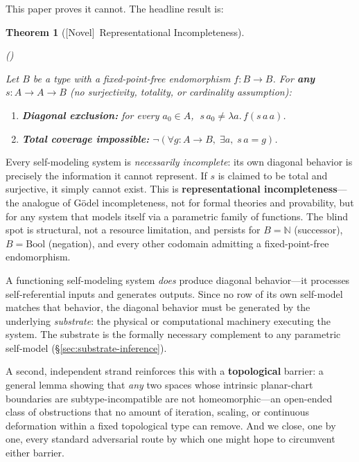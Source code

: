 \documentclass[11pt]{article}
\newtheorem{theorem}{Theorem}[section]
\newcommand{\novel}{\textcolor{blue!70!black}{[Novel]}}
\newcommand{\TheoremLeanTag}[1]{%
  \noindent\textnormal{(\leanref{#1})}\par\noindent}
\newcommand{\AfterTheoremHead}{\mbox{}\par}
\begin{document}
This paper proves it cannot.  The headline result is:

\begin{theorem}[\novel\ Representational Incompleteness]
\label{thm:summit}
\AfterTheoremHead
\TheoremLeanTag{representational\_incompleteness}
Let $B$ be a type with a fixed-point-free endomorphism $f : B \to B$.
For \textbf{any} $s : A \to A \to B$ (no surjectivity, totality, or
cardinality assumption):
\begin{enumerate}[label=(\alph*)]
\item \textbf{Diagonal exclusion:}
  for every $a_0 \in A$,
  $\;s\,a_0 \neq \lambda a.\,f(s\,a\,a)$.
\item \textbf{Total coverage impossible:}
  $\neg\!\left(\forall g : A \to B,\;\exists a,\;s\,a = g\right)$.
\end{enumerate}
\end{theorem}

\noindent
Every self-modeling system is \emph{necessarily incomplete}: its own
diagonal behavior is precisely the information it cannot represent.  If
$s$ is claimed to be total and surjective, it simply cannot exist.  This
is \textbf{representational incompleteness}---the analogue of G\"odel
incompleteness, not for formal theories and provability, but for any
system that models itself via a parametric family of functions.  The
blind spot is structural, not a resource limitation, and persists for
$B = \mathbb{N}$ (successor), $B = \mathrm{Bool}$ (negation), and every
other codomain admitting a fixed-point-free endomorphism.

A functioning self-modeling system \emph{does} produce diagonal
behavior---it processes self-referential inputs and generates
outputs.  Since no row of its own self-model matches that behavior,
the diagonal behavior must be generated by the underlying
\emph{substrate}: the physical or computational machinery executing
the system.  The substrate is the formally necessary complement to
any parametric self-model (\S\ref{sec:substrate-inference}).

A second, independent strand reinforces this with a
\textbf{topological} barrier: a general lemma showing that
\emph{any} two spaces whose intrinsic planar-chart boundaries
are subtype-incompatible are not homeomorphic---an open-ended
class of obstructions that no amount of iteration, scaling, or
continuous deformation within a fixed topological type can
remove.  And we close, one by one, every standard adversarial
route by which one might hope to circumvent either barrier.
\end{document}
